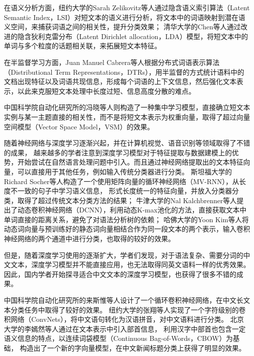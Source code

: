 \documentclass{standalone}
\begin{document}
在语义分析方面，纽约大学的Sarah Zelikovitz等人通过隐含语义索引算法（Latent Semantic Index，LSI）对短文本的语义进行分析，将文本中的词语映射到潜在语义空间，来捕获词语之间的相关性，提升分类效果；
清华大学的Chen等人通过改进的隐含狄利克雷分布（Latent Dirichlet allocation，LDA）模型，将短文本中的单词与多个粒度的话题相关联，来拓展短文本特征。

在半监督学习方面，Juan Manuel Cabrera等人根据分布式词语表示算法（Distributional Term Representations，DTRs），用半监督的方式统计语料中的文档出现特征以及词语共现信息，形成每个词语的上下文信息，然后强化文本表示，以此来克服短文本处理中长度过短、信息高度分散的难点。

中国科学院自动化研究所的冯晓等人则构造了一种集中学习模型，直接确立短文本实例与某一主题直接的相关性，而不是将短文本表示为权重向量，取得了超过向量空间模型（Vector Space Model，VSM）的效果。

随着神经网络与深度学习逐渐兴起，并在计算机视觉、语音识别等领域取得了不错的成果，
越来越多的学者注意到深度学习模型对于特征提取与数据建模上的优势，开始尝试在自然语言处理问题中引入。而且通过神经网络提取出的文本特征向量，可以直接用于其他任务，例如输入传统分类器进行分类。
斯坦福大学的Richard Socher等人构造了一个使用矩阵向量的循环神经网络（MV-RNN），从长度不一致的句子中学习语义信息，
形式长度统一的特征向量，并放入分类器分类，取得了超过传统文本分类方法的结果；
牛津大学的Nal Kalchbrenner等人提出了动态卷积神经网络（DCNN），利用动态K-max池化的方法，直接获取文本中单词直接的距离关系，避免了对语法分析树的依赖；
哈佛大学的Yoon Kim等人将动态词向量与预训练好的静态词向量相结合作为同一段文本的两个表示，输入卷积神经网络的两个通道中进行分类，也取得的较好的效果。

但是，随着深度学习使用的逐渐扩大，学者们发现，对于语法复杂、需要分词的中文文本，深度学习模型并不能直接应用，也无法取得同英文语料一样的优秀效果。因此，国内学者开始探寻适合中文文本的深度学习模型，也获得了很多不错的成果。

中国科学院自动化研究所的来斯惟等人设计了一个循环卷积神经网络，在中文长文本分类任务中取得了较好的效果。
纽约大学的张翔等人实现了一个字符级别的卷积网络（ConvNets），将中文语句转化为汉语拼音，对中文语料进行分类。
北京大学的李嫣然等人通过在文本表示中引入部首信息，
利用汉字中部首也包含一定语义信息的特点，以连续词袋模型（Continuous Bag-of-Words，CBOW）为基础，
构造出了一个新的字向量模型，在中文新闻标题分类上获得了明显的效果。
\end{document}
